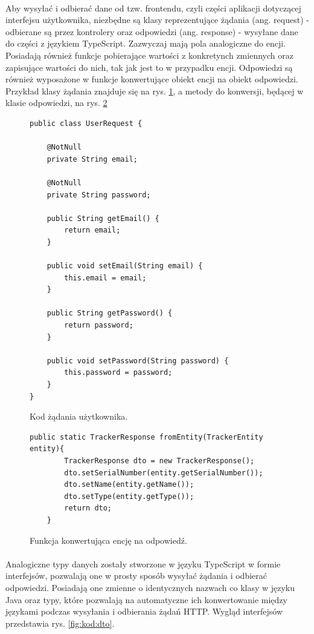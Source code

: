 \paragraph{}
Aby wysyłać i odbierać dane od tzw. frontendu, czyli części aplikacji dotyczącej interfejsu użytkownika, niezbędne są klasy reprezentujące żądania (ang. request) - odbierane są przez kontrolery oraz odpowiedzi (ang. response) - wysyłane dane do części z językiem TypeScript. Zazwyczaj mają pola analogiczne do encji. Posiadają również funkcje pobierające wartości z konkretynch zmiennych oraz zapisujące wartości do nich, tak jak jest to w przypadku encji. Odpowiedzi są również wyposażone w funkcje konwertujące obiekt encji na obiekt odpowiedzi. Przykład klasy żądania znajduje się na rys. \ref{fig:kod:request}, a metody do konwersji, będącej w klasie odpowiedzi, na rys. \ref{fig:kod:mapper}

\begin{figure}
\centering
\begin{lstlisting}
public class UserRequest {

    @NotNull
    private String email;
    
    @NotNull
    private String password;

    public String getEmail() {
        return email;
    }

    public void setEmail(String email) {
        this.email = email;
    }

    public String getPassword() {
        return password;
    }

    public void setPassword(String password) {
        this.password = password;
    }
}
\end{lstlisting}
\caption{Kod żądania użytkownika.}
\label{fig:kod:request}
\end{figure}

\begin{figure}
\centering
\begin{lstlisting}
public static TrackerResponse fromEntity(TrackerEntity entity){
        TrackerResponse dto = new TrackerResponse();
        dto.setSerialNumber(entity.getSerialNumber());
        dto.setName(entity.getName());
        dto.setType(entity.getType());
        return dto;
    }
\end{lstlisting}
\caption{Funkcja konwertująca encję na odpowiedź.}
\label{fig:kod:mapper}
\end{figure}

\paragraph{}
Analogiczne typy danych zostały stworzone w języku TypeScript w formie interfejsów, pozwalają one w prosty sposób wysyłać żądania i odbierać odpowiedzi. Posiadają one zmienne o identycznych nazwach co klasy w języku Java oraz typy, które pozwalają na automatyczne ich konwertowanie między językami podczas wysyłania i odbierania żądań HTTP. Wygląd interfejsów przedstawia rys. \ref{fig:kod:dto}.

